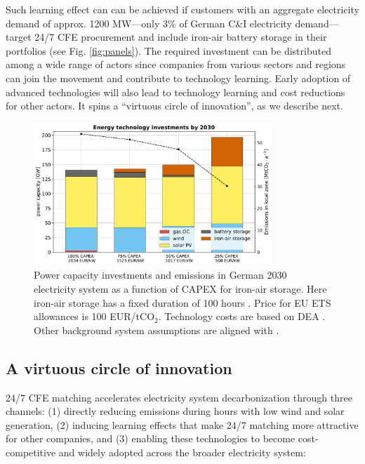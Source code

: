 \documentclass[pdflatex,sn-basic, Numbered]{sn-jnl}
\theoremstyle{thmstyleone}%
\theoremstyle{thmstyletwo}%
\theoremstyle{thmstylethree}%
\begin{document}
Such learning effect can can be achieved if customers with an aggregate electricity demand of approx. 1200 MW---only 3\% of German C\&I electricity demand---target 24/7 CFE procurement and include iron-air battery storage in their portfolios (see Fig. \ref{fig:panels}). The required investment can be distributed among a wide range of actors since companies from various sectors and regions can join the movement and contribute to technology learning.
Early adoption of advanced technologies will also lead to technology learning and cost reductions for other actors. It spins a \enquote{virtuous circle of innovation}, as we describe next.

\begin{figure}[htbp]
    \centering
    \includegraphics[width=0.8\textwidth]{images/dashboard_3.pdf}
    \caption{Power capacity investments and emissions in German 2030 electricity system as a function of CAPEX for iron-air storage. Here iron-air storage has a fixed duration of 100 hours \cite{FormEnergyLatest2024}. Price for EU ETS allowances is 100 EUR/tCO$_2$. Technology costs are based on DEA \cite{DEA-technologydata}. Other background system assumptions are aligned with \citet{riepin-zenodo-systemlevel247}.}\label{fig:impact}
\end{figure}

\subsection*{A virtuous circle of innovation}\label{sec5}

24/7 CFE matching accelerates electricity system decarbonization through three channels: (1) directly reducing emissions during hours with low wind and solar generation, (2) inducing learning effects that make 24/7 matching more attractive for other companies, and (3) enabling these technologies to become cost-competitive and widely adopted across the broader electricity system:
\end{document}
